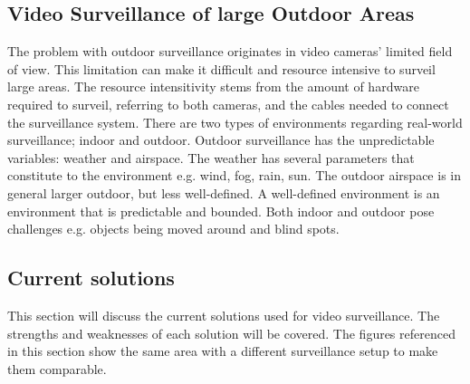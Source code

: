 \subsection{Video Surveillance of large Outdoor Areas}\label{subsec:surveillance_of_large_outdoor_areas}
The problem with outdoor surveillance originates in video cameras' limited field of view.
This limitation can make it difficult and resource intensive to surveil large areas.
The resource intensitivity stems from the amount of hardware required to surveil, referring to both cameras, and the cables needed to connect the surveillance system.
There are two types of environments regarding real-world surveillance; indoor and outdoor.
Outdoor surveillance has the unpredictable variables: weather and airspace.
The weather has several parameters that constitute to the environment e.g. wind, fog, rain, sun.
The outdoor airspace is in general larger outdoor, but less well-defined.
A well-defined environment is an environment that is predictable and bounded.
Both indoor and outdoor pose challenges e.g. objects being moved around and blind spots.

\subsection{Current solutions}
This section will discuss the current solutions used for video surveillance.
The strengths and weaknesses of each solution will be covered.
The figures referenced in this section show the same area with a different surveillance setup to make them comparable.
